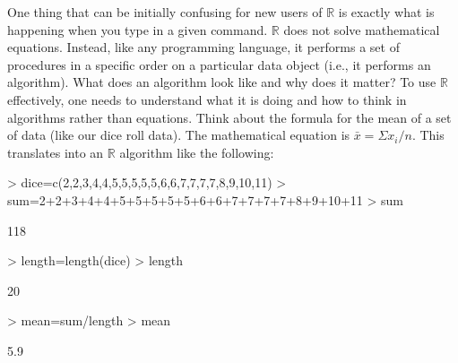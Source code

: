 \documentclass[12pt]{article}
\begin{document}
One thing that can be initially confusing for new users of $\mathbb{R}$ is exactly what is happening when you type in a given command. $\mathbb{R}$ does not solve mathematical equations. Instead, like any programming language, it performs a set of procedures in a specific order on a particular data object (i.e., it performs an algorithm). What does an algorithm look like and why does it matter? To use $\mathbb{R}$ effectively, one needs to understand what it is doing and how to think in algorithms rather than equations. Think about the formula for the mean of a set of data (like our dice roll data). The mathematical equation is $\bar{x}=\Sigma x_{i} / n$. This translates into an $\mathbb{R}$ algorithm like the following:
\begin{Schunk}
\begin{Sinput}
> dice=c(2,2,3,4,4,5,5,5,5,5,6,6,7,7,7,7,8,9,10,11)
> sum=2+2+3+4+4+5+5+5+5+5+6+6+7+7+7+7+8+9+10+11
> sum
\end{Sinput}
\begin{Soutput}
[1] 118
\end{Soutput}
\begin{Sinput}
> length=length(dice)
> length
\end{Sinput}
\begin{Soutput}
[1] 20
\end{Soutput}
\begin{Sinput}
> mean=sum/length
> mean
\end{Sinput}
\begin{Soutput}
[1] 5.9
\end{Soutput}
\end{Schunk}
\end{document}
